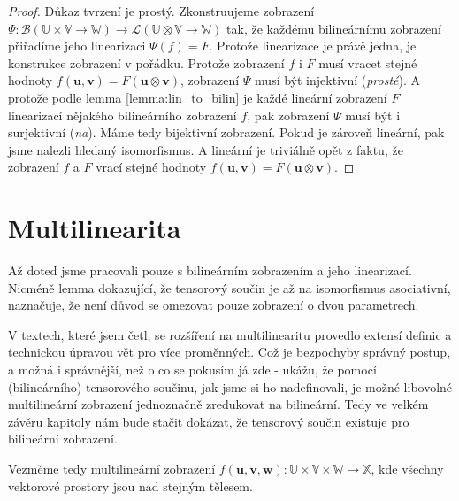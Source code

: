 \documentclass[a5paper,12pt]{amsbook}
\theoremstyle{definition}
\newcommand{\myvec}[1]{\mathbf{#1}}
\newcommand{\myspace}[1]{\mathbb{#1}}
\begin{document}
\begin{proof}
Důkaz tvrzení je prostý. Zkonstruujeme zobrazení $\Psi: \mathcal{B}(\myspace{U}\times\myspace{V}\rightarrow\myspace{W}) \rightarrow
\mathcal{L}(\myspace{U}\otimes\myspace{V}\rightarrow\myspace{W})$ tak, že každému
bilineárnímu zobrazení přiřadíme jeho linearizaci $\Psi(f) = F$. Protože linearizace
je právě jedna, je konstrukce zobrazení v pořádku. Protože zobrazení $f$ i $F$ musí vracet
stejné hodnoty $f(\myvec{u}, \myvec{v}) = F(\myvec{u}\otimes\myvec{v})$, zobrazení $\Psi$
musí být injektivní (\textit{prosté}). A protože podle lemma \ref{lemma:lin_to_bilin}
je každé lineární zobrazení $F$ linearizací nějakého bilineárního zobrazení $f$, pak zobrazení
$\Psi$ musí být i surjektivní (\textit{na}). Máme tedy bijektivní zobrazení. Pokud je zároveň
lineární, pak jsme nalezli hledaný isomorfismus. A lineární je triviálně opět z faktu,
že zobrazení $f$ a $F$ vrací stejné hodnoty $f(\myvec{u}, \myvec{v}) = F(\myvec{u}\otimes\myvec{v})$.
\end{proof}

\section{Multilinearita}

\noindent
Až doteď jsme pracovali pouze s bilineárním zobrazením a jeho linearizací. Nicméně lemma dokazující, že
tensorový součin je až na isomorfismus asociativní, naznačuje, že není důvod se omezovat pouze zobrazení
o dvou parametrech.

V textech, které jsem četl, se rozšíření na multilinearitu provedlo extensí definic a technickou
úpravou vět pro více proměnných. Což je bezpochyby správný postup, a možná i správnější, než o co
se pokusím já zde - ukážu, že pomocí (bilineárního) tensorového součinu, jak jsme si ho nadefinovali,
je možné libovolné multilineární zobrazení jednoznačně zredukovat na bilineární. Tedy ve velkém závěru
kapitoly nám bude stačit dokázat, že tensorový součin existuje pro bilineární zobrazení.

Vezměme tedy multilineární zobrazení $f(\myvec{u}, \myvec{v}, \myvec{w}):
\myspace{U}\times\myspace{V}\times\myspace{W}\rightarrow\myspace{X}$, kde všechny vektorové prostory
jsou nad stejným tělesem.
\end{document}
